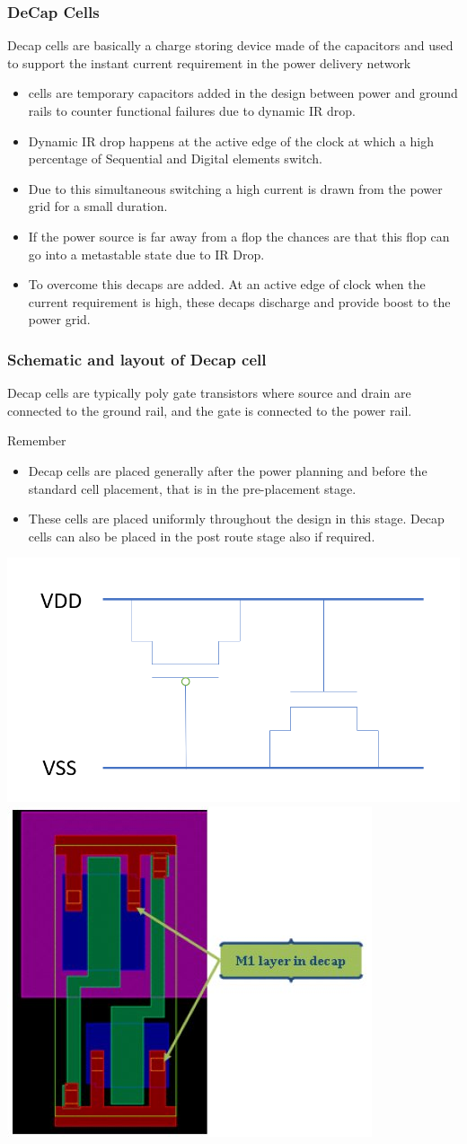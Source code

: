 \documentclass{beamer}
\begin{document}
	\begin{frame}
	\frametitle{DeCap Cells}
	Decap cells are basically a charge storing device made of the capacitors and used to support the instant current requirement in the power delivery network
	\begin{itemize}
		\item cells are temporary capacitors added in the design between power and ground rails to counter functional failures due to dynamic IR drop.
		\item Dynamic IR drop happens at the active edge of the clock at which a high percentage of Sequential and Digital elements switch.
		\item Due to this simultaneous switching a high current is drawn from the power grid for a small duration.
		\item If the power source is far away from a flop the chances are that this flop can go into a metastable state due to IR Drop.
		\item To overcome this decaps are added. At an active edge of clock when the current requirement is high, these decaps discharge and provide boost to the power grid.
	\end{itemize}

\end{frame}	
\begin{frame}
	\frametitle{Schematic and layout of Decap cell}
	Decap cells are typically poly gate transistors where source and drain are connected to the ground rail, and the gate is connected to the power rail.
		\begin{block}{Remember}
		\begin{itemize}
			\item Decap cells are placed generally after the power planning and before the standard cell placement, that is in the pre-placement stage.
			\item  These cells are placed uniformly throughout the design in this stage. Decap cells can also be placed in the post route stage also if required.
		\end{itemize}
	\end{block}
	\begin{center}
	\includegraphics[width=0.3 \textwidth]{DeCap_cell}\qquad \qquad
		\includegraphics[width=0.3 \textwidth]{Decap_layout}
	\end{center}
\end{frame}	
\end{document}
